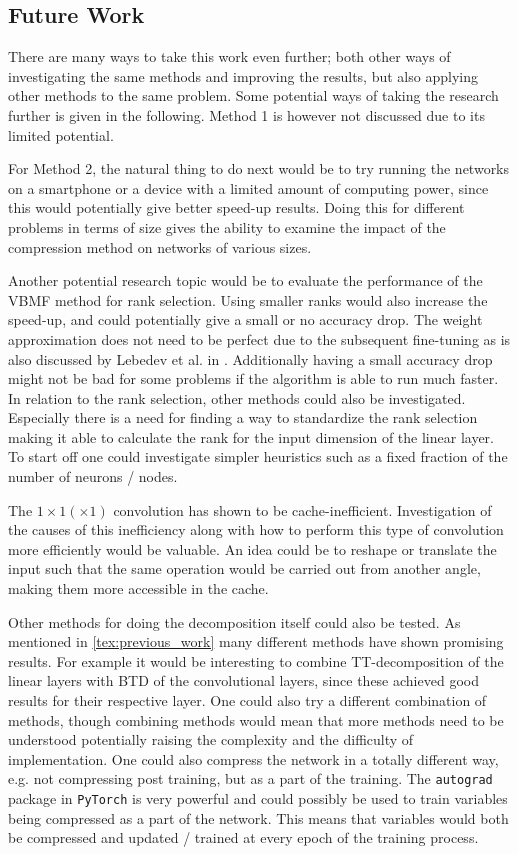 \subsection{Future Work} \label{tex:future_work}
There are many ways to take this work even further; both other ways of investigating the same methods and improving the results, but also applying other methods to the same problem. Some potential ways of taking the research further is given in the following. Method 1 is however not discussed due to its limited potential.

For Method 2, the natural thing to do next would be to try running the networks on a smartphone or a device with a limited amount of computing power, since this would potentially give better speed-up results. Doing this for different problems in terms of size gives the ability to examine the impact of the compression method on networks of various sizes.

Another potential research topic would be to evaluate the performance of the VBMF method for rank selection. Using smaller ranks would also increase the speed-up, and could potentially give a small or no accuracy drop. The weight approximation does not need to be perfect due to the subsequent fine-tuning as is also discussed by Lebedev et al. in \cite{Lebedev2015}. Additionally having a small accuracy drop might not be bad for some problems if the algorithm is able to run much faster. In relation to the rank selection, other methods could also be investigated. Especially there is a need for finding a way to standardize the rank selection making it able to calculate the rank for the input dimension of the linear layer. To start off one could investigate simpler heuristics such as a fixed fraction of the number of neurons / nodes.

The $1\times 1 (\times 1)$ convolution has shown to be cache-inefficient. Investigation of the causes of this inefficiency along with how to perform this type of convolution more efficiently would be valuable. An idea could be to reshape or translate the input such that the same operation would be carried out from another angle, making them more accessible in the cache.

Other methods for doing the decomposition itself could also be tested. As mentioned in \autoref{tex:previous_work} many different methods have shown promising results. For example it would be interesting to combine TT-decomposition of the linear layers with BTD of the convolutional layers, since these achieved good results for their respective layer. One could also try a different combination of methods, though combining methods would mean that more methods need to be understood potentially raising the complexity and the difficulty of implementation. One could also compress the network in a totally different way, e.g. not compressing post training, but as a part of the training. The \texttt{autograd} package in \texttt{PyTorch} is very powerful and could possibly be used to train variables being compressed as a part of the network. This means that variables would both be compressed and updated / trained at every epoch of the training process.